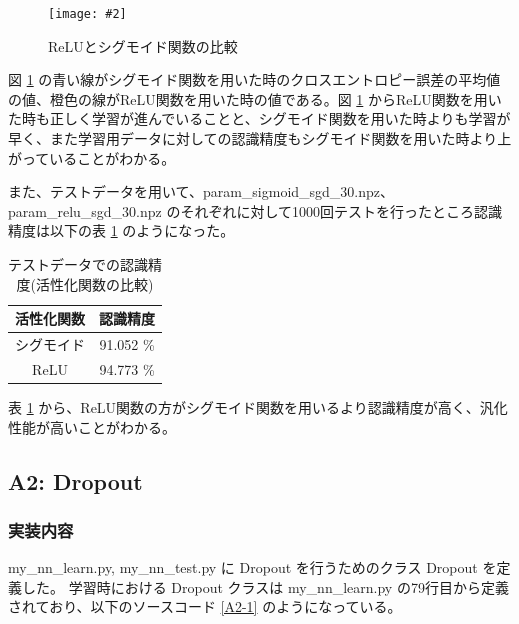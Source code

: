 \documentclass[a4paper,dvipdfmx]{jsarticle}
\newcommand{\image}[3]{
    \begin{figure}[H]
        \begin{center}
        \texttt{[image: \#2]}
        \end{center}
        \caption{#1}
        \label{#3}
    \end{figure}
}
\begin{document}
\image{ReLUとシグモイド関数の比較}{report_a1-1.png}{fig-A-1-1}

図 \ref{fig-A-1-1} の青い線がシグモイド関数を用いた時のクロスエントロピー誤差の平均値の値、橙色の線がReLU関数を用いた時の値である。図 \ref{fig-A-1-1} からReLU関数を用いた時も正しく学習が進んでいることと、シグモイド関数を用いた時よりも学習が早く、また学習用データに対しての認識精度もシグモイド関数を用いた時より上がっていることがわかる。

また、テストデータを用いて、param\_sigmoid\_sgd\_30.npz、param\_relu\_sgd\_30.npz のそれぞれに対して1000回テストを行ったところ認識精度は以下の表 \ref{table-A1-1} のようになった。

\begin{table}[H]
\begin{center}
\caption{テストデータでの認識精度(活性化関数の比較)}
  \begin{tabular}{|c|c|} \hline
    活性化関数 & 認識精度  \\ \hline \hline
    シグモイド & 91.052 \%  \\ \hline
    ReLU & 94.773 \% \\ \hline
  \end{tabular}
	\label{table-A1-1}
\end{center}
\end{table}

表 \ref{table-A1-1} から、ReLU関数の方がシグモイド関数を用いるより認識精度が高く、汎化性能が高いことがわかる。

\subsection*{A2: Dropout}

\subsubsection*{実装内容}

my\_nn\_learn.py, my\_nn\_test.py に Dropout を行うためのクラス Dropout を定義した。
学習時における Dropout クラスは my\_nn\_learn.py の79行目から定義されており、以下のソースコード \ref{A2-1} のようになっている。
\end{document}
